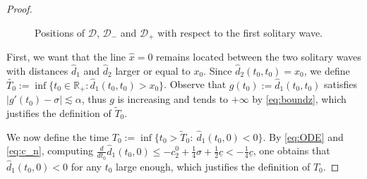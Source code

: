 \documentclass[reqno,10pt]{amsart}
\numberwithin{equation}{section}
\begin{document}
\begin{proof}
\begin{figure}[h]
\begin{minipage}{0.45\textwidth}
	\caption{Positions of $\mathcal{D}$, $\mathcal{D}_-$ and $\mathcal{D}_+$ with respect to the first solitary wave.}
	\label{fig:position_D_D-_D+}
	\end{minipage}
\end{figure}

First, we want that the line $\hat{x}=0$ remains located between the two solitary waves with distances $\hat{d}_1$ and $\hat{d}_2$ larger or equal to $x_0$. Since $\hat{d}_2(t_0,t_0)=x_0$, we define $\tilde{T_0} := \inf \big\{ t_0\in \mathbb{R}_+ :  \hat{d}_1(t_0,t_0) >x_0 \big\}$.
Observe that $g(t_0) := \hat{d}_1(t_0,t_0)$ satisfies $\left\vert g'(t_0) - \sigma \right\vert \lesssim \alpha$, thus $g$ is increasing and tends to $+\infty$ by \eqref{eq:boundz}, which justifies the definition of $\tilde{T}_0$.

 We now define the time $T_0:= \inf \{t_0>\tilde{T}_0 : \ \hat{d}_1(t_0,0)<0\}$. By \eqref{eq:ODE} and \eqref{eq:c_n}, computing $\frac{d}{dt_0} \hat{d}_1(t_0,0) \leq -c_2^0 + \frac14 \sigma + \frac12 \underline{c} < -\frac14 \underline{c} $, one obtains that $\hat{d}_1(t_0,0)<0$ for any $t_0$ large enough, which justifies the definition of $T_0$.
 

\end{proof}
\end{document}
